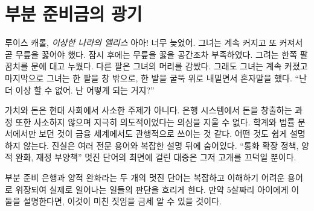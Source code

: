 \chapter{부분 준비금의 광기}
\label{les:13}

\begin{chapquote}{루이스 캐롤, \textit{이상한 나라의 앨리스}}
아아! 너무 늦었어. 그녀는 계속 커지고 또 커져서 곧 무릎을 꿇어야 했다.
잠시 후에는 무릎을 꿇을 공간조차 부족하였다. 그려는 한쪽 팔꿈치를 문에 대고 누웠다. 다른 팔은 그녀의
머리를 감쌌다. 그래도 그녀는 계속 커졌고 마지막으로 그녀는 한 팔을 창 밖으로, 한 발을 굴뚝 위로 내밀면서
혼자말을 했다. \enquote{난 더 이상 할 수 없어. 난 어떻게 되는 거지?}
\end{chapquote}

\begin{comment}
Value and money aren't trivial topics, especially in today's times. The
process of money creation in our banking system is equally non-trivial,
and I can't shake the feeling that this is deliberately so. What I have
previously only encountered in academia and legal texts seems to be
common practice in the financial world as well: nothing is explained in
simple terms, not because it is truly complex, but because the truth is
hidden behind layers and layers of jargon and \textit{apparent} complexity.
\enquote{Expansionary monetary policy, quantitative easing, fiscal stimulus to
the economy.} The audience nods along in agreement, hypnotized by the
fancy words.
\end{comment}
가치와 돈은 현대 사회에서 사소한 주제가 아니다. 
은행 시스템에서 돈을 창출하는 과정 또한 사소하지 않으며 지극히 의도적이었다는 의심을 지울 수 없다. 
학계와 법률 문서에서만 보던 것이 금융 세계에서도 관행적으로 쓰이는 것 같다.
어떤 것도 쉽게 설명하지 않는다. 진실은 여러 전문 용어와 복잡한 설명 뒤에 숨어있다.
\enquote{통화 확장 정책, 양적 완화, 재정 부양책} 멋진 단어의 최면에 걸린 대중은
그저 고개를 끄덕일 뿐이다.

\begin{comment}
Fractional reserve banking and quantitative easing are two of those
fancy words, obfuscating what is really happening by masking it as
complex and difficult to understand. If you would explain them to a
five-year-old, the insanity of both will become apparent quickly.
\end{comment}
부분 준비 은행과 양적 완화라는 두 개의 멋진 단어는 
복잡하고 이해하기 어려운 용어로 위장되여 실제로 일어나는 일들의 판단을 흐리게 한다. 
만약 5살짜리 아이에게 이 둘을 설명한다면, 이것이 미친 짓임을 금세 알 수 있을 것이다.


